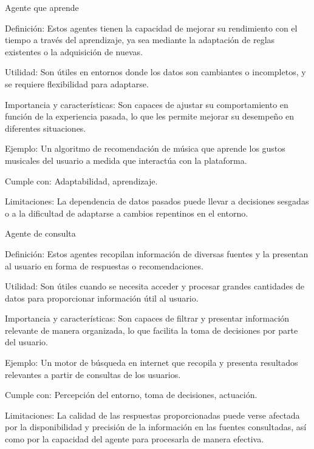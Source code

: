 \begin{myitemize}
    \item Agente que aprende
    \begin{myitemize}
        \item Definición: Estos agentes tienen la capacidad de mejorar su rendimiento con el tiempo a través del aprendizaje, ya sea mediante la adaptación de reglas existentes o la adquisición de nuevas.
        \item Utilidad: Son útiles en entornos donde los datos son cambiantes o incompletos, y se requiere flexibilidad para adaptarse.
        \item Importancia y características: Son capaces de ajustar su comportamiento en función de la experiencia pasada, lo que les permite mejorar su desempeño en diferentes situaciones.
        \item Ejemplo: Un algoritmo de recomendación de música que aprende los gustos musicales del usuario a medida que interactúa con la plataforma.
        \item Cumple con: Adaptabilidad, aprendizaje.
        \item Limitaciones: La dependencia de datos pasados puede llevar a decisiones sesgadas o a la dificultad de adaptarse a cambios repentinos en el entorno.
    \end{myitemize}
    
    \item Agente de consulta
    \begin{myitemize}
        \item Definición: Estos agentes recopilan información de diversas fuentes y la presentan al usuario en forma de respuestas o recomendaciones.
        \item Utilidad: Son útiles cuando se necesita acceder y procesar grandes cantidades de datos para proporcionar información útil al usuario.
        \item Importancia y características: Son capaces de filtrar y presentar información relevante de manera organizada, lo que facilita la toma de decisiones por parte del usuario.
        \item Ejemplo: Un motor de búsqueda en internet que recopila y presenta resultados relevantes a partir de consultas de los usuarios.
        \item Cumple con: Percepción del entorno, toma de decisiones, actuación.
        \item Limitaciones: La calidad de las respuestas proporcionadas puede verse afectada por la disponibilidad y precisión de la información en las fuentes consultadas, así como por la capacidad del agente para procesarla de manera efectiva.
    \end{myitemize}
\end{myitemize}

